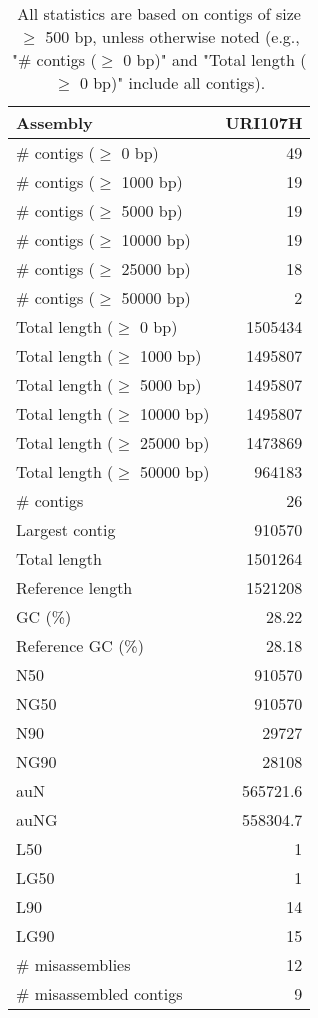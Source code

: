 \documentclass[12pt,a4paper]{article}
\begin{document}
\begin{table}[ht]
\begin{center}
\caption{All statistics are based on contigs of size $\geq$ 500 bp, unless otherwise noted (e.g., "\# contigs ($\geq$ 0 bp)" and "Total length ($\geq$ 0 bp)" include all contigs).}
\begin{tabular}{|l*{1}{|r}|}
\hline
Assembly & URI107H \\ \hline
\# contigs ($\geq$ 0 bp) & 49 \\ \hline
\# contigs ($\geq$ 1000 bp) & 19 \\ \hline
\# contigs ($\geq$ 5000 bp) & 19 \\ \hline
\# contigs ($\geq$ 10000 bp) & 19 \\ \hline
\# contigs ($\geq$ 25000 bp) & 18 \\ \hline
\# contigs ($\geq$ 50000 bp) & 2 \\ \hline
Total length ($\geq$ 0 bp) & 1505434 \\ \hline
Total length ($\geq$ 1000 bp) & 1495807 \\ \hline
Total length ($\geq$ 5000 bp) & 1495807 \\ \hline
Total length ($\geq$ 10000 bp) & 1495807 \\ \hline
Total length ($\geq$ 25000 bp) & 1473869 \\ \hline
Total length ($\geq$ 50000 bp) & 964183 \\ \hline
\# contigs & 26 \\ \hline
Largest contig & 910570 \\ \hline
Total length & 1501264 \\ \hline
Reference length & 1521208 \\ \hline
GC (\%) & 28.22 \\ \hline
Reference GC (\%) & 28.18 \\ \hline
N50 & 910570 \\ \hline
NG50 & 910570 \\ \hline
N90 & 29727 \\ \hline
NG90 & 28108 \\ \hline
auN & 565721.6 \\ \hline
auNG & 558304.7 \\ \hline
L50 & 1 \\ \hline
LG50 & 1 \\ \hline
L90 & 14 \\ \hline
LG90 & 15 \\ \hline
\# misassemblies & 12 \\ \hline
\# misassembled contigs & 9 \\ \hline

\end{tabular}
\end{center}
\end{table}
\end{document}
